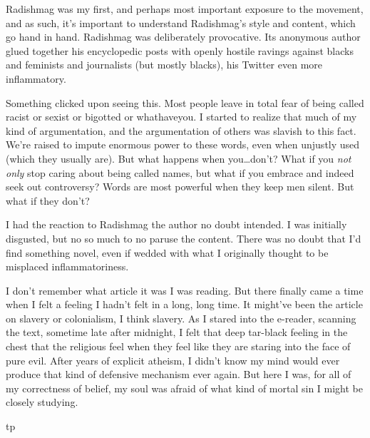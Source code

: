 \documentclass{book}
\begin{document}
Radishmag was my first, and perhaps most important exposure to the movement, and as such, it's important to understand Radishmag's style and content, which go hand in hand. Radishmag was deliberately provocative. Its anonymous author glued together his encyclopedic posts with openly hostile ravings against blacks and feminists and journalists (but mostly blacks), his Twitter even more inflammatory.

Something clicked upon seeing this. Most people leave in total fear of being called racist or sexist or bigotted or whathaveyou. I started to realize that much of my kind of argumentation, and the argumentation of others was slavish to this fact. We're raised to impute enormous power to these words, even when unjustly used (which they usually are). But what happens when you\ldots don't? What if you \emph{not only} stop caring about being called names, but what if you embrace and indeed seek out controversy? Words are most powerful when they keep men silent. But what if they don't?

I had the reaction to Radishmag the author no doubt intended. I was initially disgusted, but no so much to no paruse the content. There was no doubt that I'd find something novel, even if wedded with what I originally thought to be misplaced inflammatoriness. 





I don't remember what article it was I was reading. But there finally came a time when I felt a feeling I hadn't felt in a long, long time. It might've been the article on slavery or colonialism, I think slavery. As I stared into the e-reader, scanning the text, sometime late after midnight, I felt that deep tar-black feeling in the chest that the religious feel when they feel like they are staring into the face of pure evil. After years of explicit atheism, I didn't know my mind would ever produce that kind of defensive mechanism ever again. But here I was, for all of my correctness of belief, my soul was afraid of what kind of mortal sin I might be closely studying.

tp



\end{document}
